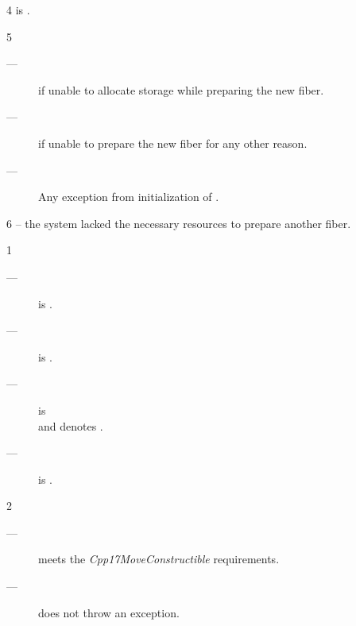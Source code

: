 4 \postcond
\emptyfn is \false.

5 \except
\begin{description}
    \item[---]  if unable to allocate storage while preparing
               the new fiber.
    \item[---]  if unable to prepare the new fiber for any
               other reason.
    \item[---] Any exception from initialization of .
\end{description}

6 \errors
{} -- the system lacked the necessary resources to prepare another fiber.


1 \mandates
\begin{description}
    \item[---]  is \true.
    \item[---]  is \true.
    \item[---]  is \true\\
               and  denotes \fiber\cpp{\&\&}.
    \item[---]  is \true.
\end{description}

2 \precond
\begin{description}
    \item[---]  meets the \emph{Cpp17MoveConstructible} requirements.
    \item[---]  does not throw an exception.
\end{description}


